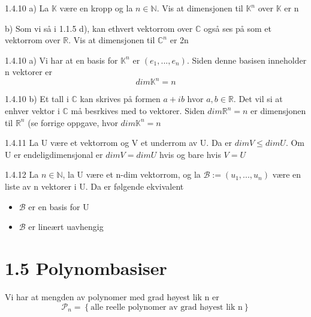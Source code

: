 \documentclass[a4paper,norsk]{article}
\renewcommand{\leq}{\leqslant}
\begin{document}
\begin{oppgavebox}{1.4.10}{}
a) La $ \mathbb{K} $  være en kropp og la $ n \in \mathbb{N} $. Vis at dimensjonen til $ \mathbb{K}^n $ over $ \mathbb{K} $ er n

b) Som vi så i 1.1.5 d), kan ethvert vektorrom over $ \mathbb{C} $ også ses på som et vektorrom over $ \mathbb{R} $. Vis at dimensjonen til $ \mathbb{C}^n $ er 2n


\begin{proofbox}{1.4.10 a)}{}
Vi har at en basis for $ \mathbb{K}^n$  er $ \left( e_1, ..., e_n \right)  $. Siden denne basisen inneholder n vektorer er
\[
    dim \mathbb{K}^n = n
\]
\end{proofbox}

\begin{proofbox}{1.4.10 b)}{}
Et tall i $ \mathbb{C} $ kan skrives på formen $ a + ib $ hvor $ a, b \in \mathbb{R} $. Det vil si at enhver vektor i $ \mathbb{C} $ må besrkives med to vektorer. Siden $ dim \mathbb{R}^n = n $ er dimensjonen til $ \mathbb{R}^n $ (se forrige oppgave, hvor $ dim \mathbb{K}^n = n $ 
\end{proofbox}
\end{oppgavebox}

\begin{propositionbox}{1.4.11}{}
La U være et vektorrom og V et underrom av U. Da er $ dim V \leq dimU $. Om U er endeligdimensjonal er $ dim V = dim U $ hvis og bare hvis $ V=U $ 
\end{propositionbox}

\begin{corollarybox}{1.4.12}{}
La $ n \in \mathbb{N} $, la U være et n-dim vektorrom, og la $ \mathcal{B} := \left( u_1, ..., u_n \right)  $ være en liste av n vektorer i U. Da er følgende ekvivalent
\begin{itemize}
    \item $ \mathcal{B}  $ er en basis for U
    \item $ \mathcal{B} $ er lineært uavhengig
\end{itemize} 
\end{corollarybox}


\section*{1.5 Polynombasiser}

Vi har at mengden av polynomer med grad høyest lik n er 
\[
    \mathcal{P}_n = \left\{ \text{alle reelle polynomer av grad høyest lik n} \right\} 
\]
\end{document}
